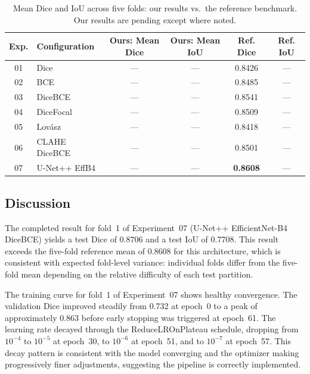 \documentclass[a4paper,12pt]{article}
\begin{document}
\begin{table}[htbp]
\centering
\caption{Mean Dice and IoU across five folds: our results vs.\ the reference benchmark.
  Our results are pending except where noted.}
\label{tab:average_results}
\renewcommand{\arraystretch}{1.3}
\begin{tabular}{|c|l|cc|cc|}
\hline
\textbf{Exp.} & \textbf{Configuration}
  & \textbf{Ours: Mean Dice} & \textbf{Ours: Mean IoU}
  & \textbf{Ref. Dice} & \textbf{Ref. IoU} \\ \hline
01 & Dice               & --- & --- & 0.8426 & --- \\ \hline
02 & BCE                & --- & --- & 0.8485 & --- \\ \hline
03 & DiceBCE            & --- & --- & 0.8541 & --- \\ \hline
04 & DiceFocal          & --- & --- & 0.8509 & --- \\ \hline
05 & Lovász             & --- & --- & 0.8418 & --- \\ \hline
06 & CLAHE DiceBCE      & --- & --- & 0.8501 & --- \\ \hline
07 & U-Net++ EffB4      & --- & --- & \textbf{0.8608} & --- \\ \hline
\end{tabular}
\end{table}


\subsection{Discussion}
\label{sub:discussion}

The completed result for fold~1 of Experiment~07 (U-Net++
EfficientNet-B4 DiceBCE) yields a test Dice of 0.8706 and a test IoU of 0.7708.
This result exceeds the five-fold reference mean of 0.8608 for this architecture, which is
consistent with expected fold-level variance: individual folds differ from the five-fold mean
depending on the relative difficulty of each test partition.

The training curve for fold~1 of Experiment~07 shows healthy convergence. The validation Dice
improved steadily from 0.732 at epoch~0 to a peak of approximately 0.863 before early stopping
was triggered at epoch~61. The learning rate decayed through the ReduceLROnPlateau schedule,
dropping from $10^{-4}$ to $10^{-5}$ at epoch~30, to $10^{-6}$ at epoch~51, and to $10^{-7}$
at epoch~57. This decay pattern is consistent with the model converging and the optimizer making
progressively finer adjustments, suggesting the pipeline is correctly implemented.
\end{document}
